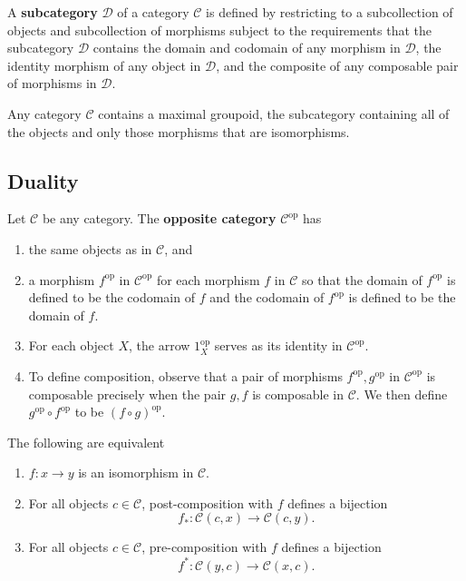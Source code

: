 A \textbf{subcategory} $ \mathcal{D} $ of a category $ \mathcal{C} $ is defined by restricting to a subcollection of objects and subcollection of morphisms subject to the requirements that the subcategory $ \mathcal{D} $ contains the domain and codomain of any morphism in $ \mathcal{D} $, the identity morphism of any object in $ \mathcal{D} $, and the composite of any composable pair of morphisms in $ \mathcal{D} $.

\begin{lemma}
  Any category $ \mathcal{C} $ contains a maximal groupoid, the subcategory containing all of the objects and only those morphisms that are isomorphisms.
\end{lemma}


\subsection{Duality} %
\label{sub:duality}


\begin{definition}
  Let $ \mathcal{C} $ be any category. The \textbf{opposite category} $ \mathcal{C}^{\text{op}} $ has
  \begin{enumerate}
    \item the same objects as in $ \mathcal{C} $, and
    \item a morphism $ f^{\text{op}} $ in $ \mathcal{C}^{\text{op}} $ for each morphism $ f $ in $ \mathcal{C} $ so that the domain of $ f^{\text{op}} $ is defined to be the codomain of $ f $ and the codomain of $ f^{\text{op}} $ is defined to be the domain of $ f $.
    \item For each object $ X $, the arrow $ 1^{\text{op}}_{X} $ serves as its identity in $ \mathcal{C}^{\text{op}} $.
    \item To define composition, observe that a pair of morphisms $ f^{\text{op}}, g^{\text{op}} $ in $ \mathcal{C}^{\text{op}} $ is composable precisely when the pair $ g,f $ is composable in $ \mathcal{C} $. We then define $ g^{\text{op}}\circ f^{\text{op}} $ to be $ (f\circ g)^{\text{op}} $.
  \end{enumerate}

\end{definition}

\begin{lemma}
   The following are equivalent
   \begin{enumerate}
     \item $ f:x \to y $ is an isomorphism in $ \mathcal{C} $.
     \item For all objects $ c \in \mathcal{C} $, post-composition with $ f $ defines a bijection
       \[
         f_{*}: \mathcal{C}(c, x) \to \mathcal{C}(c, y)
      .\]
    \item For all objects $ c \in \mathcal{C} $, pre-composition with $ f $ defines a bijection
      \[
        f^{*}: \mathcal{C}(y, c) \to \mathcal{C}(x, c)
      .\]

   \end{enumerate}
\end{lemma}

